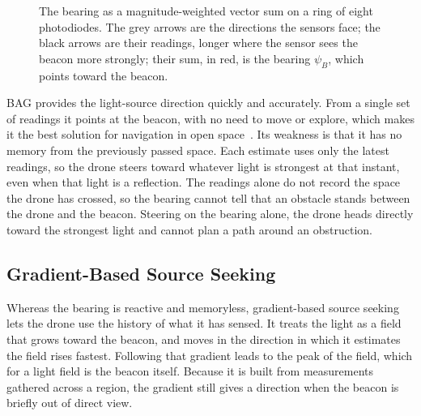 \begin{figure}[ht]
    \centering
    \caption{The bearing as a magnitude-weighted vector sum on a ring of eight photodiodes. The grey arrows are the directions the sensors face; the black arrows are their readings, longer where the sensor sees the beacon more strongly; their sum, in red, is the bearing $\psi_B$, which points toward the beacon.}
    \label{fig:bearing-vectorsum}
\end{figure}

BAG provides the light-source direction quickly and accurately. From a single set of readings it points at the beacon, with no need to move or explore, which makes it the best solution for navigation in open space~\cite{huang2026lta}. Its weakness is that it has no memory from the previously passed space. Each estimate uses only the latest readings, so the drone steers toward whatever light is strongest at that instant, even when that light is a reflection. The readings alone do not record the space the drone has crossed, so the bearing cannot tell that an obstacle stands between the drone and the beacon. Steering on the bearing alone, the drone heads directly toward the strongest light and cannot plan a path around an obstruction.

\subsection{Gradient-Based Source Seeking}
\label{sec:gradient-based-source-seeking}

Whereas the bearing is reactive and memoryless, gradient-based source seeking lets the drone use the history of what it has sensed. It treats the light as a field that grows toward the beacon, and moves in the direction in which it estimates the field rises fastest. Following that gradient leads to the peak of the field, which for a light field is the beacon itself. Because it is built from measurements gathered across a region, the gradient still gives a direction when the beacon is briefly out of direct view.

